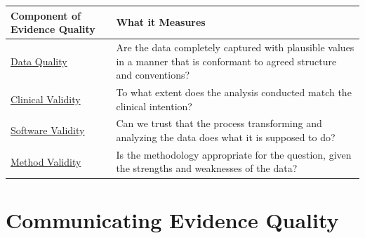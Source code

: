 \documentclass[11pt]{book}
\theoremstyle{definition}
\theoremstyle{definition}
\theoremstyle{definition}
\theoremstyle{remark}
\begin{document}
\begin{longtable}[]{@{}ll@{}}
\toprule
\begin{minipage}[b]{0.19\columnwidth}\raggedright
Component of Evidence Quality\strut
\end{minipage} & \begin{minipage}[b]{0.75\columnwidth}\raggedright
What it Measures\strut
\end{minipage}\tabularnewline
\midrule
\endhead
\begin{minipage}[t]{0.19\columnwidth}\raggedright
\href{DataQuality.html}{Data Quality}\strut
\end{minipage} & \begin{minipage}[t]{0.75\columnwidth}\raggedright
Are the data completely captured with plausible values in a manner that is conformant to agreed structure and conventions?\strut
\end{minipage}\tabularnewline
\begin{minipage}[t]{0.19\columnwidth}\raggedright
\href{ClinicalValidity.html}{Clinical Validity}\strut
\end{minipage} & \begin{minipage}[t]{0.75\columnwidth}\raggedright
To what extent does the analysis conducted match the clinical intention?\strut
\end{minipage}\tabularnewline
\begin{minipage}[t]{0.19\columnwidth}\raggedright
\href{SoftwareValidity.html}{Software Validity}\strut
\end{minipage} & \begin{minipage}[t]{0.75\columnwidth}\raggedright
Can we trust that the process transforming and analyzing the data does what it is supposed to do?\strut
\end{minipage}\tabularnewline
\begin{minipage}[t]{0.19\columnwidth}\raggedright
\href{MethodValidity.html}{Method Validity}\strut
\end{minipage} & \begin{minipage}[t]{0.75\columnwidth}\raggedright
Is the methodology appropriate for the question, given the strengths and weaknesses of the data?\strut
\end{minipage}\tabularnewline
\bottomrule
\end{longtable}

\hypertarget{communicating-evidence-quality}{%
\section{Communicating Evidence Quality}\label{communicating-evidence-quality}}
\end{document}
